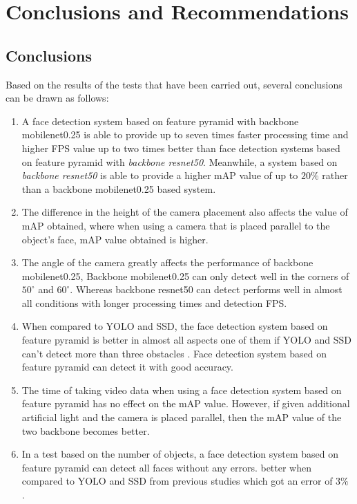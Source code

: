 \section{Conclusions and Recommendations}
\label{sec:kesimpulan}

\subsection{Conclusions}
Based on the results of the tests that have been carried out, several conclusions can be drawn as follows:

\begin{enumerate}

  \item A face detection system based on feature pyramid with backbone mobilenet0.25 is able to provide
  up to seven times faster processing time and higher FPS value
  up to two times better than face detection systems based on 
  feature pyramid with \emph{backbone resnet50}.
  Meanwhile, a system based on \emph{backbone resnet50} is able to provide a higher mAP value of up to $20\%$
  rather than a backbone mobilenet0.25 based system.

  \item The difference in the height of the camera placement also affects the value of
  mAP obtained, where when using a camera that is placed parallel to the object's face,
  mAP value obtained is higher.

  \item The angle of the camera greatly affects the performance of backbone mobilenet0.25, Backbone mobilenet0.25
  can only detect well in the corners of $50^\circ$ and $60^\circ$. Whereas backbone resnet50 can detect
  performs well in almost all conditions with longer processing times and detection FPS.

  \item When compared to YOLO and SSD, the face detection system based on feature pyramid is better in almost all aspects
  one of them if YOLO and SSD can't detect more than three obstacles \citep{nugrohoevalution2016}. Face detection system
  based on feature pyramid can detect it with good accuracy.

  \item The time of taking video data when using a face detection system based on feature pyramid has no effect on the mAP value.
  However, if given additional artificial light and the camera is placed parallel, then the mAP value of the two backbone becomes better.

  \item In a test based on the number of objects, a face detection system based on feature pyramid can detect all faces without any errors.
  better when compared to YOLO and SSD from previous studies which got an error of $3\%$ \citep{nugrohoevalution2016}.


\end{enumerate}


